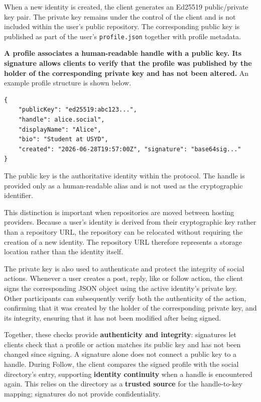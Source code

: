 When a new identity is created, the client generates an Ed25519 public/private key pair. The private key remains under the control of the client and is not included within the user's public repository. The corresponding public key is published as part of the user's \texttt{profile.json} together with profile metadata.


\textbf{A profile associates a human-readable handle with a public key. Its signature allows clients to verify that the profile was published by the holder of the corresponding private key and has not been altered.} An example profile structure is shown below. 


\begin{verbatim} 
{ 
    "publicKey": "ed25519:abc123...", 
    "handle": alice.social", 
    "displayName": "Alice", 
    "bio": "Student at USYD", 
    "created": "2026-06-28T19:57:00Z", "signature": "base64sig..." 
} 
\end{verbatim} 

The public key is the authoritative identity within the protocol. The handle is provided only as a human-readable alias and is not used as the cryptographic identifier. 

This distinction is important when repositories are moved between hosting providers. Because a user's identity is derived from their cryptographic key rather than a repository URL, the repository can be relocated without requiring the creation of a new identity. The repository URL therefore represents a storage location rather than the identity itself. 

The private key is also used to authenticate and protect the integrity of social actions. Whenever a user creates a post, reply, like or follow action, the client signs the corresponding JSON object using the active identity's private key. Other participants can subsequently verify both the authenticity of the action, confirming that it was created by the holder of the corresponding private key, and its integrity, ensuring that it has not been modified after being signed. 


Together, these checks provide \textbf{authenticity and integrity}: signatures let clients check that a profile or action matches its public key and has not been changed since signing. A signature alone does not connect a public key to a handle. During Follow, the client compares the signed profile with the social directory's entry, supporting \textbf{identity continuity} when a handle is encountered again. This relies on the directory as a \textbf{trusted source} for the handle-to-key mapping; signatures do not provide confidentiality.


